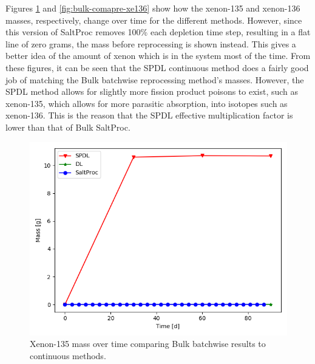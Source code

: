 Figures \ref{fig:bulk-comapre-xe135} and \ref{fig:bulk-comapre-xe136} show how the xenon-135 and xenon-136 masses, respectively, change over time for the different methods. However, since this version of SaltProc removes 100\% each depletion time step, resulting in a flat line of zero grams, the mass before reprocessing is shown instead. This gives a better idea of the amount of xenon which is in the system most of the time. From these figures, it can be seen that the SPDL continuous method does a fairly good job of matching the Bulk batchwise reprocessing method's masses. However, the SPDL method allows for slightly more fission product poisons to exist, such as xenon-135, which allows for more parasitic absorption, into isotopes such as xenon-136. This is the reason that the SPDL effective multiplication factor is lower than that of Bulk SaltProc.

\begin{figure}[H]
  \centering
  \includegraphics[scale=0.7]{images/soln-3-Xe135.png}
  \caption{Xenon-135 mass over time comparing Bulk batchwise results to continuous methods.}
   \label{fig:bulk-comapre-xe135}
\end{figure}

